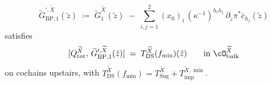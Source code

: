 \begin{theorem}
\begin{equation}\label{eq:bp-tilde-G-prime-upstairs}
 \widetilde G^{\prime, \widetilde X}_{\mathrm{BP}, 1}(\tilde z)
 \;\coloneqq\; \widetilde G_1^{\widetilde X}(\tilde z)
 \;-\; \sum_{i,j=1}^{2} (x_0)_i\, (\kappa^{-1})^{h_i h_j}\,
 \partial_{\tilde z} \pi^{\ast}\bar c_{h_j}(\tilde z)
\end{equation}
satisfies
\begin{equation}\label{eq:bp-strict-chain-DS-upstairs}
 [Q_{\mathrm{tot}}^{\widetilde X},\,
 \widetilde G^{\prime, \widetilde X}_{\mathrm{BP}, 1}(\tilde z)]
 \;=\; T_{\mathrm{DS}}^{\widetilde X}(f_{\min})(\tilde z)
 \qquad \text{in $\cO_{\mathrm{bulk}}^{\widetilde X}$}
\end{equation}
on cochains upstairs, with $T_{\mathrm{DS}}^{\widetilde X}(f_{\min})
= T_{\mathrm{Sug}}^{\widetilde X} + T_{\mathrm{imp}}^{\widetilde X, \min}$.
\end{theorem}


